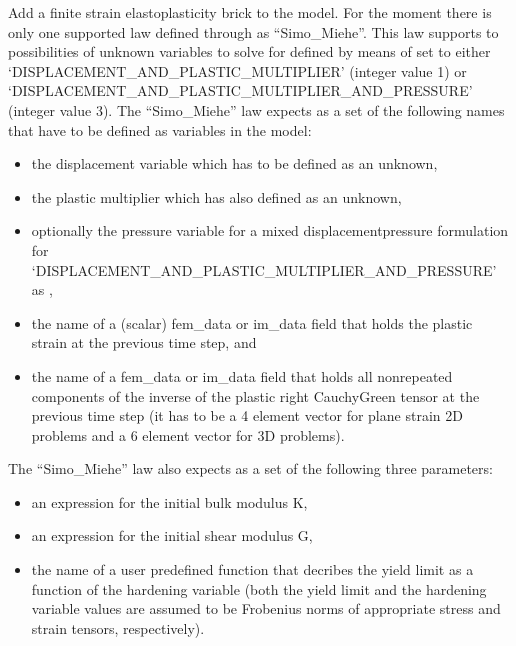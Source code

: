 \documentclass[a4paper,11pt,english]{sphinxmanual}
\begin{document}
\begin{fulllineitems}
\begin{fulllineitems}
Add a finite strain elastoplasticity brick to the model.
For the moment there is only one supported law defined through 
 as “Simo\_Miehe”.
This law supports to possibilities of unknown variables to solve for
defined by means of  set to either
‘DISPLACEMENT\_AND\_PLASTIC\_MULTIPLIER’ (integer value 1) or
‘DISPLACEMENT\_AND\_PLASTIC\_MULTIPLIER\_AND\_PRESSURE’ (integer value 3).
The  “Simo\_Miehe” law expects as  a set of the
following names that have to be defined as variables in the model:
\begin{itemize}
\item {} 
the displacement variable which has to be defined as an unknown,

\item {} 
the plastic multiplier which has also defined as an unknown,

\item {} 
optionally the pressure variable for a mixed displacement\sphinxhyphen{}pressure
formulation for ‘DISPLACEMENT\_AND\_PLASTIC\_MULTIPLIER\_AND\_PRESSURE’
as ,

\item {} 
the name of a (scalar) fem\_data or im\_data field that holds the
plastic strain at the previous time step, and

\item {} 
the name of a fem\_data or im\_data field that holds all
non\sphinxhyphen{}repeated components of the inverse of the plastic right
Cauchy\sphinxhyphen{}Green tensor at the previous time step
(it has to be a 4 element vector for plane strain 2D problems
and a 6 element vector for 3D problems).

\end{itemize}

The  “Simo\_Miehe” law also expects as  a set of the
following three parameters:
\begin{itemize}
\item {} 
an expression for the initial bulk modulus K,

\item {} 
an expression for the initial shear modulus G,

\item {} 
the name of a user predefined function that decribes
the yield limit as a function of the hardening variable
(both the yield limit and the hardening variable values are
assumed to be Frobenius norms of appropriate stress and strain
tensors, respectively).


\end{itemize}
\end{fulllineitems}
\end{fulllineitems}
\end{document}
